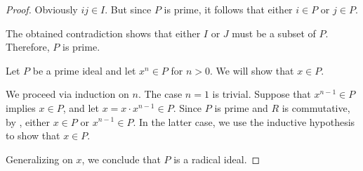 \begin{proof}
  Obviously \( ij \in I \). But since \( P \) is prime, it follows that either \( i \in P \) or \( j \in P \).

  The obtained contradiction shows that either \( I \) or \( J \) must be a subset of \( P \). Therefore, \( P \) is prime.

   Let \( P \) be a prime ideal and let \( x^n \in P \) for \( n > 0 \). We will show that \( x \in P \).

  We proceed via induction on \( n \). The case \( n = 1 \) is trivial. Suppose that \( x^{n-1} \in P \) implies \( x \in P \), and let \( x = x \cdot x^{n-1} \in P \). Since \( P \) is prime and \( R \) is commutative, by , either \( x \in P \) or \( x^{n-1} \in P \). In the latter case, we use the inductive hypothesis to show that \( x \in P \).

  Generalizing on \( x \), we conclude that \( P \) is a radical ideal.
\end{proof}


